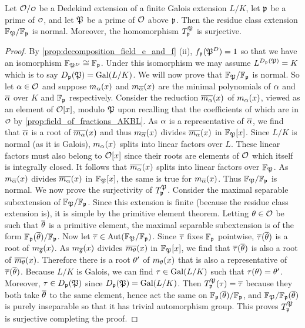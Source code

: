     \begin{proposition}\label{prop:T_map_is_surjective}
      Let $\mc{O}/\smc{O}$ be a Dedekind extension of a finite Galois extension $L/K$, let $\mathfrak{p}$ be a prime of $\smc{O}$, and let $\mathfrak{P}$ be a prime of $\mathcal{O}$ above $\mathfrak{p}$. Then the residue class extension $\mathbb{F}_{\mathfrak{P}}/\mathbb{F}_{\mathfrak{p}}$ is normal. Moreover, the homomorphism $T_{\mathfrak{p}}^{\mathfrak{P}}$ is surjective.
    \end{proposition}
    \begin{proof}
      By \cref{prop:decomposition_field_e_and_f} (ii), $f_{\mathfrak{p}}(\mathfrak{P}^{D}) = 1$ so that we have an isomorphism $\mathbb{F}_{\mathfrak{P}^{D}} \cong \mathbb{F}_{\mathfrak{p}}$. Under this isomorphism we may assume $L^{D_{\mathfrak{p}}(\mathfrak{P})} = K$ which is to say $D_{\mathfrak{p}}(\mathfrak{P}) = \operatorname{\mathrm{Gal}}(L/K)$. We will now prove that $\mathbb{F}_{\mathfrak{P}}/\mathbb{F}_{\mathfrak{p}}$ is normal. So let $\alpha \in \mathcal{O}$ and suppose $m_{\alpha}(x)$ and $m_{\overline{\alpha}}(x)$ are the minimal polynomials of $\alpha$ and $\overline{\alpha}$ over $K$ and $\mathbb{F}_{\mathfrak{p}}$ respectively. Consider the reduction $\overline{m_{\alpha}}(x)$ of $m_{\alpha}(x)$, viewed as an element of $\mathcal{O}[x]$, modulo $\mathfrak{P}$ upon recalling that the coefficients of which are in $\smc{O}$ by \cref{prop:field_of_fractions_AKBL}. As $\alpha$ is a representative of $\overline{\alpha}$, we find that $\overline{\alpha}$ is a root of $\overline{m_{\alpha}}(x)$ and thus $m_{\overline{\alpha}}(x)$ divides $\overline{m_{\alpha}}(x)$ in $\mathbb{F}_{\mathfrak{P}}[x]$. Since $L/K$ is normal (as it is Galois), $m_{\alpha}(x)$ splits into linear factors over $L$. These linear factors must also belong to $\mathcal{O}[x]$ since their roots are elements of $\mathcal{O}$ which itself is integrally closed. It follows that $\overline{m_{\alpha}}(x)$ splits into linear factors over $\mathbb{F}_{\mathfrak{P}}$. As $m_{\overline{\alpha}}(x)$ divides $\overline{m_{\alpha}}(x)$ in $\mathbb{F}_{\mathfrak{P}}[x]$, the same is true for $m_{\overline{\alpha}}(x)$. Thus $\mathbb{F}_{\mathfrak{P}}/\mathbb{F}_{\mathfrak{p}}$ is normal. We now prove the surjectivity of $T_{\mathfrak{p}}^{\mathfrak{P}}$. Consider the maximal separable subextension of $\mathbb{F}_{\mathfrak{P}}/\mathbb{F}_{\mathfrak{p}}$. Since this extension is finite (because the residue class extension is), it is simple by the primitive element theorem. Letting $\theta \in \mathcal{O}$ be such that $\overline{\theta}$ is a primitive element, the maximal separable subextension is of the form $\mathbb{F}_{\mathfrak{p}}(\overline{\theta})/\mathbb{F}_{\mathfrak{p}}$. Now let $\overline{\tau} \in \operatorname{\mathrm{Aut}}(\mathbb{F}_{\mathfrak{P}}/\mathbb{F}_{\mathfrak{p}})$. Since $\overline{\tau}$ fixes $\mathbb{F}_{\mathfrak{p}}$ pointwise, $\overline{\tau}(\overline{\theta})$ is a root of $m_{\overline{\theta}}(x)$. As $m_{\overline{\theta}}(x)$ divides $\overline{m_{\theta}}(x)$ in $\mathbb{F}_{\mathfrak{P}}[x]$, we find that $\overline{\tau}(\overline{\theta})$ is also a root of $\overline{m_{\theta}}(x)$. Therefore there is a root $\theta'$ of $m_{\theta}(x)$ that is also a representative of $\overline{\tau}(\overline{\theta})$. Because $L/K$ is Galois, we can find $\tau \in \operatorname{\mathrm{Gal}}(L/K)$ such that $\tau(\theta) = \theta'$. Moreover, $\tau \in D_{\mathfrak{p}}(\mathfrak{P})$ since $D_{\mathfrak{p}}(\mathfrak{P}) = \operatorname{\mathrm{Gal}}(L/K)$. Then $T_{\mathfrak{p}}^{\mathfrak{P}}(\tau) = \overline{\tau}$ because they both take $\overline{\theta}$ to the same element, hence act the same on $\mathbb{F}_{\mathfrak{p}}(\overline{\theta})/\mathbb{F}_{\mathfrak{p}}$, and $\mathbb{F}_{\mathfrak{P}}/\mathbb{F}_{\mathfrak{p}}(\overline{\theta})$ is purely inseparable so that it has trivial automorphism group. This proves $T_{\mathfrak{p}}^{\mathfrak{P}}$ is surjective completing the proof.
    \end{proof}

